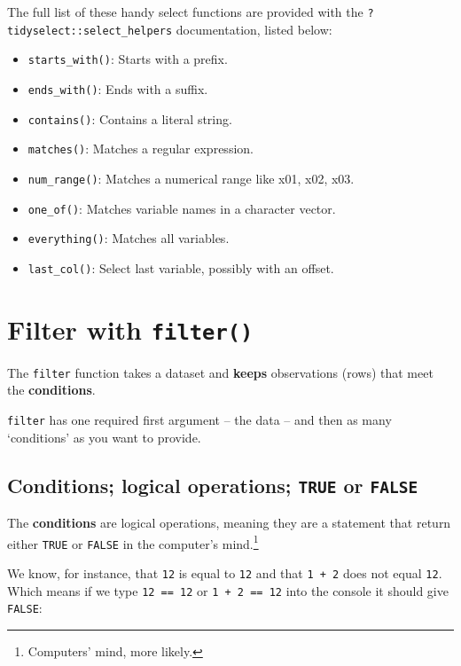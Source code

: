 \documentclass[
]{book}
\providecommand{\tightlist}{%
  \setlength{\itemsep}{0pt}\setlength{\parskip}{0pt}}
\begin{document}
The full list of these handy select functions are provided with the \texttt{?tidyselect::select\_helpers} documentation, listed below:

\begin{itemize}
\tightlist
\item
  \texttt{starts\_with()}: Starts with a prefix.
\item
  \texttt{ends\_with()}: Ends with a suffix.
\item
  \texttt{contains()}: Contains a literal string.
\item
  \texttt{matches()}: Matches a regular expression.
\item
  \texttt{num\_range()}: Matches a numerical range like x01, x02, x03.
\item
  \texttt{one\_of()}: Matches variable names in a character vector.
\item
  \texttt{everything()}: Matches all variables.
\item
  \texttt{last\_col()}: Select last variable, possibly with an offset.
\end{itemize}

\hypertarget{filter-with-filter}{%
\section{\texorpdfstring{Filter with \texttt{filter()}}{Filter with filter()}}\label{filter-with-filter}}

The \texttt{filter} function takes a dataset and \textbf{keeps} observations (rows) that meet the \textbf{conditions}.

\texttt{filter} has one required first argument -- the data -- and then as many `conditions' as you want to provide.

\hypertarget{conditions-logical-operations-true-or-false}{%
\subsection{\texorpdfstring{Conditions; logical operations; \texttt{TRUE} or \texttt{FALSE}}{Conditions; logical operations; TRUE or FALSE}}\label{conditions-logical-operations-true-or-false}}

The \textbf{conditions} are logical operations, meaning they are a statement that return either \texttt{TRUE} or \texttt{FALSE} in the computer's mind.\footnote{Computers' mind, more likely.}

We know, for instance, that \texttt{12} is equal to \texttt{12} and that \texttt{1\ +\ 2} does not equal \texttt{12}. Which means if we type \texttt{12\ ==\ 12} or \texttt{1\ +\ 2\ ==\ 12} into the console it should give \texttt{FALSE}:
\end{document}
